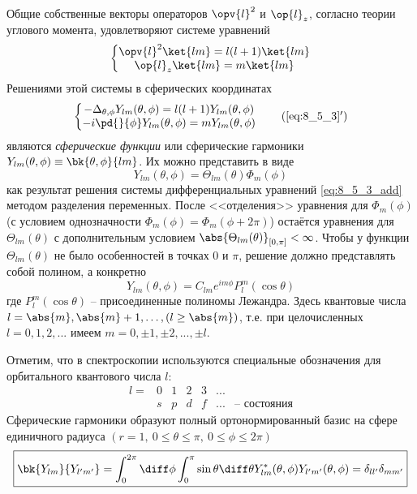 Общие собственные векторы операторов $\opv{l}^2$ и $\op{l}_z$, согласно теории углового момента, удовлетворяют системе уравнений
\begin{equation}
\label{eq:8_5_3}
\left\{
  \begin{matrix}
    \opv{l}^2 \ket{lm} = l(l+1)\ket{lm} \\
    \op{l}_z \ket{lm} = m \ket{lm}
  \end{matrix}
\right.
\end{equation}%
%
Решениями этой системы в сферических координатах
\begin{equation}
\left\{
  \begin{matrix}
  \label{eq:8_5_3_add}
   - \Delta_{\theta, \phi} Y_{lm}(\theta, \phi) = l(l+1) Y_{lm}(\theta, \phi) 
    \\
     -i\pd{}{\phi} Y_{lm}(\theta, \phi) = m Y_{lm}(\theta, \phi) 
  \end{matrix}
\right .
\tag{\ref{eq:8_5_3}$'$}
\end{equation}%
%
являются {\em сферические функции} или {сферические гармоники} $Y_{lm}(\theta, \phi) \equiv \bk{\theta, \phi}{lm}$. Их можно представить в виде
$$
Y_{lm}(\theta, \phi) = \Theta_{lm}(\theta) \Phi_m(\phi)
$$%
%
как результат решения системы дифференциальных уравнений \eqref{eq:8_5_3_add} методом разделения переменных. После <<отделения>> уравнения для $\Phi_m(\phi)$ (с условием однозначности $\Phi_m(\phi) = \Phi_m(\phi + 2\pi)$) остаётся уравнения для $\Theta_{lm}(\theta)$ с дополнительным условием $\abs{\Theta_{lm}(\theta)}_{[0,\pi]} < \infty$. Чтобы у функции $\Theta_{lm}(\theta)$ не было особенностей в точках $0$ и $\pi$, решение должно представлять собой полином, а конкретно
$$
\boxed{
  Y_{lm}(\theta, \phi) = C_{lm} e^{im\phi} P^m_l(\cos \theta)
}
$$%
%
где  $P^m_l(\cos \theta)$ -- присоединенные полиномы Лежандра. Здесь квантовые числа $l = \abs{m}, \abs{m} + 1, \dots, (l \ge \abs{m})$, т.е. при целочисленных $l = 0, 1, 2, ...$ имеем $m = 0, \pm 1, \pm 2, ..., \pm l$.

Отметим, что в спектроскопии используются специальные обозначения для орбитального квантового числа $l$:
$$
\begin{matrix}
l =  & 0 & 1 & 2 & 3 & ... & \\
       & s & p & d & f & ... & \text{-- состояния}
\end{matrix}
$$%
%
Сферические гармоники образуют полный ортонормированный базис на сфере единичного радиуса $(r = 1,~0 \leqslant \theta \leqslant \pi,~0 \leqslant \phi \leqslant 2\pi)$
\begin{equation}
\label{eq:8_5_4}
\boxed{\bk{Y_{lm}}{Y_{l'm'}} = \int_0^{2\pi} \diff\phi \int_0^\pi \sin \theta \diff\theta Y^*_{lm}(\theta, \phi) Y_{l'm'}(\theta, \phi) = \delta_{ll'} \delta_{mm'}}
\end{equation}